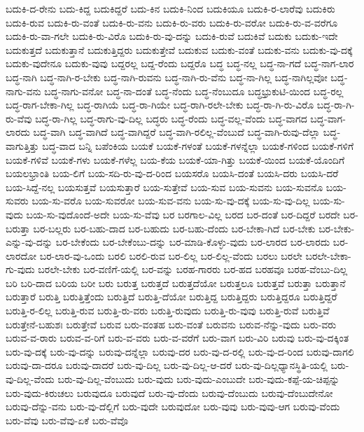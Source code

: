 {ಬದುಕಿ-ದ-ರೇನು
ಬದು-ಕಿದ್ದ
ಬದುಕಿದ್ದರೆ
ಬದು-ಕಿನ
ಬದುಕಿ-ನಿಂದ
ಬದುಕಿಯೂ
ಬದುಕಿ-ರ-ಲಾರೆವು
ಬದುಕಿರು
ಬದುಕಿ-ರುವ
ಬದುಕಿ-ರು-ವಂತೆ
ಬದುಕಿ-ರು-ವನು
ಬದುಕಿ-ರು-ವರು
ಬದುಕಿ-ರು-ವರೋ
ಬದುಕಿ-ರು-ವ-ವರೆಗೂ
ಬದುಕಿ-ರು-ವಾ-ಗಲೇ
ಬದುಕಿ-ರು-ವಿರೊ
ಬದುಕಿ-ರು-ವು-ದನ್ನು
ಬದುಕಿ-ರುವೆ
ಬದುಕಿವೆ
ಬದುಕು
ಬದುಕು-ಇದೇ
ಬದುಕುತ್ತದೆ
ಬದುಕುತ್ತಾನೆ
ಬದುಕುತ್ತಿದ್ದರು
ಬದುಕುತ್ತೇವೆ
ಬದುಕುವ
ಬದುಕು-ವಂತೆ
ಬದುಕು-ವನು
ಬದುಕು-ವು-ದಕ್ಕೆ
ಬದುಕು-ವುದೇನೂ
ಬದುಕು-ವುವು
ಬದ್ದರಲ್ಲ
ಬದ್ದ-ರೆಂದು
ಬದ್ದರೊ
ಬದ್ಧ
ಬದ್ಧ-ನಲ್ಲ
ಬದ್ಧ-ನಾ-ಗದೆ
ಬದ್ಧ-ನಾಗ-ಲಾರ
ಬದ್ಧ-ನಾಗಿ
ಬದ್ಧ-ನಾಗಿ-ರ-ಬೇಕು
ಬದ್ಧ-ನಾಗಿ-ರುವನು
ಬದ್ಧ-ನಾಗಿ-ರು-ವೆನು
ಬದ್ಧ-ನಾ-ಗಿಲ್ಲ
ಬದ್ಧ-ನಾಗಿಲ್ಲವೋ
ಬದ್ಧ-ನಾಗು-ವನು
ಬದ್ಧ-ನಾಗು-ವನೋ
ಬದ್ಧ-ನಾ-ದಂತೆ
ಬದ್ಧ-ನೆಂದು
ಬದ್ಧ-ನೆಂಬುದೂ
ಬದ್ಧಭ್ರುಕುಟಿ-ಯಿಂದ
ಬದ್ಧ-ರಲ್ಲ
ಬದ್ಧ-ರಾಗ-ಬೇಕಾ-ಗಿಲ್ಲ
ಬದ್ಧ-ರಾಗಿಯೆ
ಬದ್ಧ-ರಾ-ಗಿಯೇ
ಬದ್ಧ-ರಾಗಿ-ರಲೇ-ಬೇಕು
ಬದ್ಧ-ರಾ-ಗಿ-ರು-ವಿರೊ
ಬದ್ಧ-ರಾ-ಗಿ-ರು-ವೆವು
ಬದ್ಧ-ರಾ-ಗಿಲ್ಲ
ಬದ್ಧ-ರಾಗು-ವು-ದಿಲ್ಲ
ಬದ್ಧರು
ಬದ್ಧ-ರೆಂದು
ಬದ್ಧ-ವಲ್ಲ-ವೆಂದು
ಬದ್ಧ-ವಾಗದ
ಬದ್ಧ-ವಾಗ-ಲಾರದು
ಬದ್ಧ-ವಾಗಿ
ಬದ್ಧ-ವಾಗಿದೆ
ಬದ್ಧ-ವಾಗಿದ್ದರೆ
ಬದ್ಧ-ವಾಗಿ-ರಲಿಲ್ಲ-ವೆಂಬುದೆ
ಬದ್ಧ-ವಾಗಿ-ರುವು-ದೆಲ್ಲಾ
ಬದ್ಧ-ವಾಗುತ್ತಿತ್ತು
ಬದ್ಧ-ವಾದ
ಬನ್ನಿ
ಬಪೆಂಕಿಯ
ಬಯಕೆ
ಬಯಕೆ-ಗಳಂತೆ
ಬಯಕೆ-ಗಳನ್ನೆಲ್ಲಾ
ಬಯಕೆ-ಗಳಿಂದ
ಬಯಕೆ-ಗಳಿಗೆ
ಬಯಕೆ-ಗಳಿವೆ
ಬಯಕೆ-ಗಳು
ಬಯಕೆ-ಗಳೆಲ್ಲ
ಬಯ-ಕೆಯ
ಬಯಕೆ-ಯಾ-ಗಿತ್ತು
ಬಯಕೆ-ಯಿಂದ
ಬಯಕೆ-ಯೊಂದಿಗೆ
ಬಯಲಭ್ರಾಂತಿ
ಬಯ-ಲಿಗೆ
ಬಯ-ಸದಿ-ರು-ವು-ದ-ರಿಂದ
ಬಯಸರೊ
ಬಯಸಿ-ದಂತೆ
ಬಯಸಿ-ದರು
ಬಯಸಿ-ದರೆ
ಬಯ-ಸಿದ್ದೆ-ನಲ್ಲ
ಬಯಸುತ್ತವೆ
ಬಯಸುತ್ತಾರೆ
ಬಯ-ಸುತ್ತೇವೆ
ಬಯ-ಸುವ
ಬಯ-ಸುವನು
ಬಯ-ಸುವನೊ
ಬಯ-ಸುವರು
ಬಯ-ಸು-ವರೊ
ಬಯ-ಸುವರೋ
ಬಯ-ಸುವ-ವನು
ಬಯ-ಸು-ವು-ದಕ್ಕೆ
ಬಯ-ಸು-ವು-ದಿಲ್ಲ
ಬಯ-ಸು-ವುದು
ಬಯ-ಸು-ವುದೊಂದೆ-ಅದೇ
ಬಯ-ಸು-ವೆವು
ಬರ
ಬರಗಾಲ-ವಿಲ್ಲ
ಬರದ
ಬರ-ದಂತೆ
ಬರ-ದಿದ್ದರೆ
ಬರದೇ
ಬರ-ಬರುತ್ತಾ
ಬರ-ಬಲ್ಲರು
ಬರ-ಬಹು-ದಾದ
ಬರ-ಬಹುದು
ಬರ-ಬಹು-ದೆಂದು
ಬರ-ಬೇಕಾ-ಗಿದೆ
ಬರ-ಬೇಕು
ಬರ-ಬೇಕು-ಎನ್ನು-ವು-ದನ್ನು
ಬರ-ಬೇಕೆಂದು
ಬರ-ಬೇಕೆಂಬು-ದನ್ನು
ಬರ-ಮಾಡಿ-ಕೊಳ್ಳು-ವುದು
ಬರ-ಲಾರದ
ಬರ-ಲಾರದು
ಬರ-ಲಾರದೋ
ಬರ-ಲಾರ-ವು-ಒಂದು
ಬರಲಿ
ಬರಲಿ-ರುವ
ಬರ-ಲಿಲ್ಲ
ಬರ-ಲಿಲ್ಲ-ವೆಂದು
ಬರಲು
ಬರಲೇ
ಬರಲೇ-ಬೇಕಾ-ಗು-ವುದು
ಬರಲೇ-ಬೇಕು
ಬರ-ವಣಿಗೆ-ಯಲ್ಲಿ
ಬರ-ವನ್ನು
ಬರಹ-ಗಾರರು
ಬರ-ಹದ
ಬರಹವೂ
ಬರಹ-ವೆಂಬು-ದಿಲ್ಲ
ಬರಿ
ಬರಿ-ದಾದ
ಬರಿಯ
ಬರೀ
ಬರು
ಬರುತ್ತ
ಬರುತ್ತದೆ
ಬರುತ್ತದೆಯೋ
ಬರುತ್ತಲೂ
ಬರುತ್ತವೆ
ಬರುತ್ತಾ
ಬರುತ್ತಾನೆ
ಬರುತ್ತಾರೆ
ಬರುತ್ತಿ
ಬರುತ್ತಿತ್ತೆಂದು
ಬರುತ್ತಿದೆ
ಬರುತ್ತಿ-ದೆಯೋ
ಬರುತ್ತಿದ್ದ
ಬರುತ್ತಿದ್ದರು
ಬರುತ್ತಿದ್ದರೂ
ಬರುತ್ತಿದ್ದರೆ
ಬರುತ್ತಿ-ರ-ಲಿಲ್ಲ
ಬರುತ್ತಿ-ರುವ
ಬರುತ್ತಿ-ರು-ವರು
ಬರುತ್ತಿ-ರುವುದು
ಬರುತ್ತಿ-ರು-ವುವು
ಬರುತ್ತಿ-ರುವೆ
ಬರುತ್ತಿವೆ
ಬರುತ್ತೇನೆ-ಬಹುಶಃ
ಬರುತ್ತೇವೆ
ಬರುವ
ಬರು-ವಂತಹ
ಬರು-ವಂತೆ
ಬರುವನು
ಬರುವ-ನೆನ್ನು-ವುದು
ಬರು-ವರು
ಬರುವ-ವ-ರಾರು
ಬರುವ-ವ-ರಿಗೆ
ಬರು-ವ-ವರು
ಬರು-ವ-ವರೆಗೆ
ಬರು-ವಾಗ
ಬರು-ವಿರಿ
ಬರುವು
ಬರು-ವು-ದಕ್ಕಿಂತ
ಬರು-ವು-ದಕ್ಕೆ
ಬರು-ವು-ದನ್ನು
ಬರುವು-ದನ್ನೆಲ್ಲಾ
ಬರುವು-ದರ
ಬರು-ವು-ದ-ರಲ್ಲಿ
ಬರು-ವು-ದ-ರಿಂದ
ಬರುವು-ದಾಗಲಿ
ಬರುವು-ದಾ-ದರೂ
ಬರುವು-ದಾದರೆ
ಬರು-ವು-ದಿಲ್ಲ
ಬರು-ವು-ದಿಲ್ಲ-ಆ-ದರೆ
ಬರು-ವು-ದಿಲ್ಲಧ್ಯಾನಸ್ಥಿತಿ-ಯಲ್ಲಿ
ಬರು-ವು-ದಿಲ್ಲ-ವೆಂದು
ಬರು-ವು-ದಿಲ್ಲ-ವೆಂಬುದು
ಬರು-ವುದು
ಬರು-ವುದು-ಎಂಬುದೇ
ಬರು-ವುದು-ಕಪ್ಪೆ-ಯ-ಚಿಪ್ಪನ್ನು
ಬರು-ವುದು-ಕಿರುಚಲು
ಬರುವುದೂ
ಬರುವುದೆ
ಬರು-ವು-ದೆಂದು
ಬರುವು-ದೆಂಬುದು
ಬರುವು-ದೆಂಬುದೇನೋ
ಬರುವು-ದೆನ್ನು-ವನು
ಬರು-ವು-ದೆಲ್ಲಿಗೆ
ಬರು-ವುದೇ
ಬರುವುದೋ
ಬರು-ವುವು
ಬರು-ವುವು-ಆಗ
ಬರುವು-ವೆಂದು
ಬರು-ವೆವು
ಬರು-ವೆವು-ಏಕೆ
ಬರು-ವೆವೊ
}
